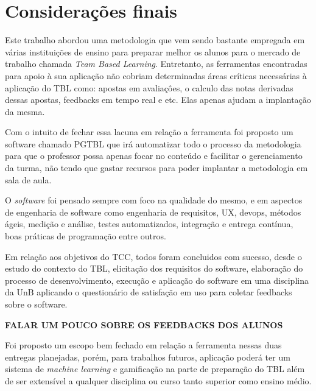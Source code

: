 \chapter{Considerações finais}

Este trabalho abordou uma metodologia que vem sendo bastante empregada em várias instituições de ensino para preparar melhor os alunos para o mercado de trabalho chamada \textit{Team Based Learning}. Entretanto, as ferramentas encontradas para apoio à sua aplicação não cobriam determinadas áreas críticas necessárias à aplicação do TBL como: apostas em avaliaçôes, o calculo das notas derivadas dessas apostas, feedbacks em tempo real e etc. Elas apenas ajudam a implantação da mesma.

Com o intuito de fechar essa lacuna em relação a ferramenta foi proposto um software chamado PGTBL que irá automatizar todo o processo da metodologia para que o professor possa apenas focar no conteúdo e facilitar o gerenciamento da turma, não tendo que gastar recursos para poder implantar a metodologia em sala de aula.

O \textit{software} foi pensado sempre com foco na qualidade do mesmo, e em aspectos de engenharia de software como engenharia de requisitos, UX, devops, métodos ágeis, medição e análise, testes automatizados, integração e entrega contínua, boas práticas de programação entre outros.

Em relação aos objetivos do TCC, todos foram concluidos com sucesso, desde o estudo do contexto do TBL, elicitação dos
requisitos do software, elaboração do processo de desenvolvimento, execução e aplicação do software em uma disciplina da
UnB aplicando o questionário de satisfação em uso para coletar feedbacks sobre o software.

\textbf{FALAR UM POUCO SOBRE OS FEEDBACKS DOS ALUNOS}

Foi proposto um escopo bem fechado em relação a ferramenta nessas duas entregas planejadas, porém, para trabalhos futuros, aplicação poderá ter um sistema de \textit{machine learning} e gamificação na parte de preparação do TBL além de ser extensível a qualquer disciplina ou curso tanto superior como ensino médio.
